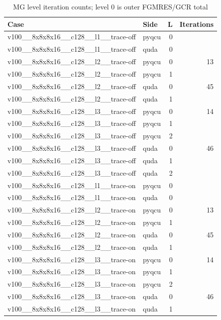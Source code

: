 \begin{table}[htbp]
\centering
\caption{MG level iteration counts; level 0 is outer FGMRES/GCR total}
\small
\begin{tabular}{@{}llrr@{}}
\toprule
Case & Side & L & Iterations \\
\midrule
v100\_\_8x8x8x16\_\_c128\_\_l1\_\_trace-off & pyqcu & 0 &  \\
v100\_\_8x8x8x16\_\_c128\_\_l1\_\_trace-off & quda & 0 &  \\
v100\_\_8x8x8x16\_\_c128\_\_l2\_\_trace-off & pyqcu & 0 & 13 \\
v100\_\_8x8x8x16\_\_c128\_\_l2\_\_trace-off & pyqcu & 1 &  \\
v100\_\_8x8x8x16\_\_c128\_\_l2\_\_trace-off & quda & 0 & 45 \\
v100\_\_8x8x8x16\_\_c128\_\_l2\_\_trace-off & quda & 1 &  \\
v100\_\_8x8x8x16\_\_c128\_\_l3\_\_trace-off & pyqcu & 0 & 14 \\
v100\_\_8x8x8x16\_\_c128\_\_l3\_\_trace-off & pyqcu & 1 &  \\
v100\_\_8x8x8x16\_\_c128\_\_l3\_\_trace-off & pyqcu & 2 &  \\
v100\_\_8x8x8x16\_\_c128\_\_l3\_\_trace-off & quda & 0 & 46 \\
v100\_\_8x8x8x16\_\_c128\_\_l3\_\_trace-off & quda & 1 &  \\
v100\_\_8x8x8x16\_\_c128\_\_l3\_\_trace-off & quda & 2 &  \\
v100\_\_8x8x8x16\_\_c128\_\_l1\_\_trace-on & pyqcu & 0 &  \\
v100\_\_8x8x8x16\_\_c128\_\_l1\_\_trace-on & quda & 0 &  \\
v100\_\_8x8x8x16\_\_c128\_\_l2\_\_trace-on & pyqcu & 0 & 13 \\
v100\_\_8x8x8x16\_\_c128\_\_l2\_\_trace-on & pyqcu & 1 &  \\
v100\_\_8x8x8x16\_\_c128\_\_l2\_\_trace-on & quda & 0 & 45 \\
v100\_\_8x8x8x16\_\_c128\_\_l2\_\_trace-on & quda & 1 &  \\
v100\_\_8x8x8x16\_\_c128\_\_l3\_\_trace-on & pyqcu & 0 & 14 \\
v100\_\_8x8x8x16\_\_c128\_\_l3\_\_trace-on & pyqcu & 1 &  \\
v100\_\_8x8x8x16\_\_c128\_\_l3\_\_trace-on & pyqcu & 2 &  \\
v100\_\_8x8x8x16\_\_c128\_\_l3\_\_trace-on & quda & 0 & 46 \\
v100\_\_8x8x8x16\_\_c128\_\_l3\_\_trace-on & quda & 1 &  \\

\end{tabular}
\end{table}
